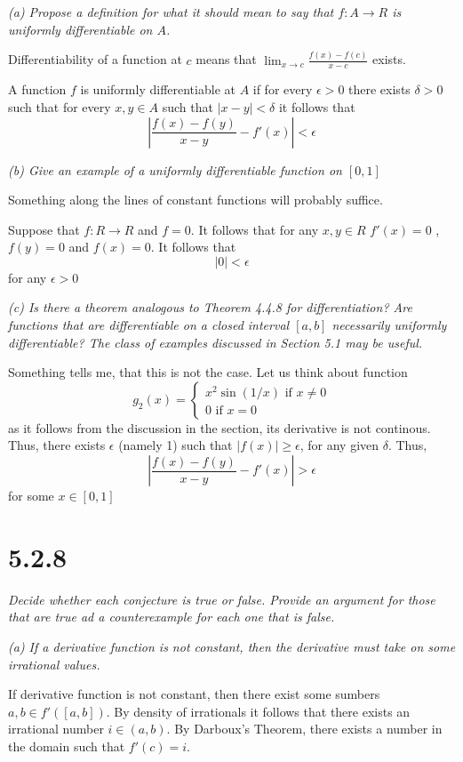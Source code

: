 \documentclass[11pt,oneside,titlepage]{book}
\begin{document}
\textit{(a) Propose a definition for what it should mean to say that
  $f: A \to R$ is uniformly differentiable on $A$.}

Differentiability of a function at $c$ means that
$\lim_{x \to c}\frac{f(x) - f(c)}{x - c}$
exists. 

A function $f$ is uniformly differentiable at $A$ if for every $\epsilon > 0$
there exists $\delta > 0$ such that for every $x, y \in A$ such that
$|x - y| < \delta$ it follows that 
$$\left|\frac{f(x) - f(y)}{x - y} - f'(x)\right| < \epsilon$$

\textit{(b) Give an example of a uniformly differentiable function on $[0, 1]$}

Something along the lines of constant functions will probably suffice.

Suppose that $f: R \to R$ and  $f = 0$. It follows that for any
$x, y \in R$ $f'(x) = 0$ , $f(y) = 0$ and $f(x) = 0$. It follows that
$$|0| < \epsilon$$
for any $\epsilon > 0$

\textit{(c) Is there a theorem analogous to Theorem 4.4.8 for differentiation?
  Are functions that are differentiable on a closed interval $[a, b]$
  necessarily uniformly differentiable? The class of examples discussed in
  Section 5.1 may be useful.}

Something tells me, that this is not the case. Let us think about
function
\begin{equation}
  g_2(x) =
  \begin{cases}
    x^2 \sin(1/x)\text{ if } x \neq 0 \\
    0 \text{ if } x = 0
  \end{cases}
\end{equation}
as it follows from the discussion in the section, its derivative is not
continous. Thus, there exists $\epsilon$ (namely 1)
such that $|f(x)| \geq \epsilon$, for any given $\delta$. Thus,
$$|\frac{f(x) - f(y)}{x - y} - f'(x)| > \epsilon$$
for some $x \in [0, 1]$

\section*{5.2.8}
\textit{Decide whether each conjecture is true or false. Provide an argument
  for those that are true ad a counterexample for each one that is false.}

\textit{(a) If a derivative function is not constant, then the derivative must
  take on some irrational values.}

If derivative function is not constant, then there exist some sumbers
$a, b \in f'([a, b])$. By density of irrationals it follows that there exists
an irrational number  $i \in (a, b)$. By Darboux's Theorem, there exists
a number in the domain such that $f'(c) = i$.
\end{document}
